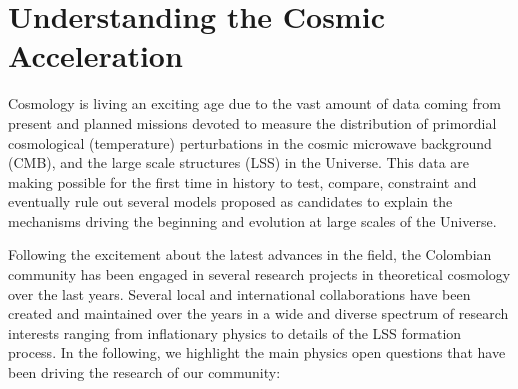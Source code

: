 \documentclass[a4paper,11pt]{article}
\begin{document}
\section{Understanding the Cosmic Acceleration}
Cosmology is living an exciting age due to the vast amount of data coming from present and planned missions devoted to measure the distribution of primordial cosmological (temperature) perturbations in  the cosmic microwave background (CMB), and the large scale structures (LSS) in the Universe. This data are making possible for the first time in history to test, compare, constraint and eventually rule out several models proposed as candidates to explain the mechanisms driving the beginning and evolution at large scales of the Universe. 

Following the excitement about the latest advances in the field, the Colombian community has been engaged in several research projects in theoretical cosmology over the last years. Several local and international collaborations have been created and maintained over the years in a wide and diverse spectrum of research interests ranging from inflationary physics to details of the LSS formation process. In the following, we highlight the main physics open questions that have been driving the research of our community:
\end{document}
